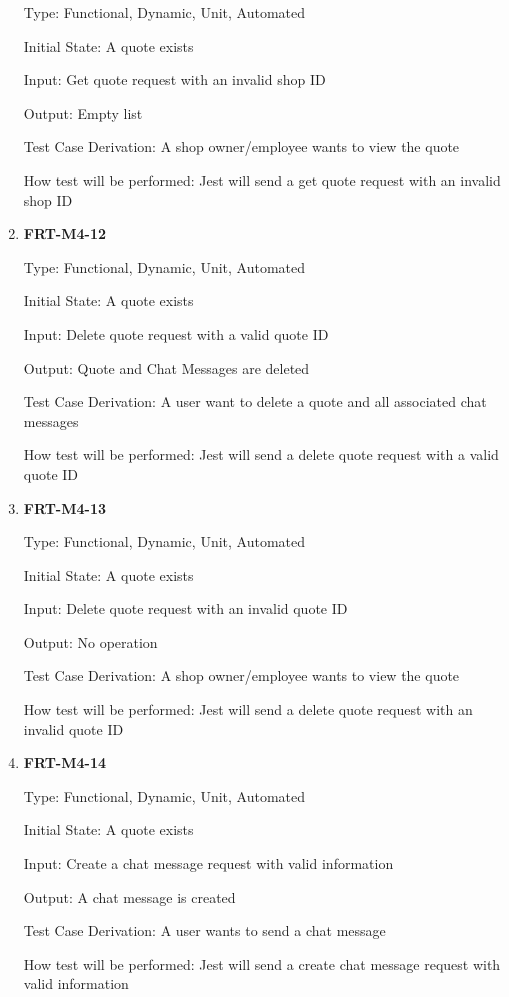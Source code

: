 \documentclass[12pt, titlepage]{article}
\begin{document}
\begin{enumerate}
	      Type: Functional, Dynamic, Unit, Automated

	      Initial State: A quote exists

	      Input: Get quote request with an invalid shop ID

	      Output: Empty list

	      Test Case Derivation: A shop owner/employee wants to view the quote

	      How test will be performed: Jest will send a get quote request with an invalid shop ID

	\item \textbf{FRT-M4-12}

	      Type: Functional, Dynamic, Unit, Automated

	      Initial State: A quote exists

	      Input: Delete quote request with a valid quote ID

	      Output: Quote and Chat Messages are deleted

	      Test Case Derivation: A user want to delete a quote and all associated chat messages

	      How test will be performed: Jest will send a delete quote request with a valid quote ID

	\item \textbf{FRT-M4-13}

	      Type: Functional, Dynamic, Unit, Automated

	      Initial State: A quote exists

	      Input: Delete quote request with an invalid quote ID

	      Output: No operation

	      Test Case Derivation: A shop owner/employee wants to view the quote

	      How test will be performed: Jest will send a delete quote request with an invalid quote ID

	\item \textbf{FRT-M4-14}

	      Type: Functional, Dynamic, Unit, Automated

	      Initial State: A quote exists

	      Input: Create a chat message request with valid information

	      Output: A chat message is created

	      Test Case Derivation: A user wants to send a chat message

	      How test will be performed: Jest will send a create chat message request with valid information


\end{enumerate}
\end{document}
